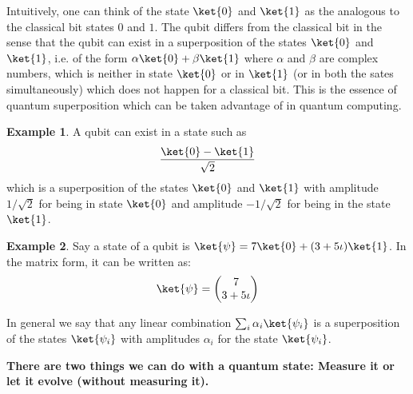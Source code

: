 \documentclass[12pt, oneside]{book}
\theoremstyle{definition}
\theoremstyle{definition}
\newtheorem{example}{Example}[section]
\theoremstyle{remark}
\begin{document}
Intuitively, one can think of the state $\ket{0}$ and $\ket{1}$ as the analogous to the classical bit states $0$ and $1$. 
The qubit differs from the classical bit in the sense that the qubit can exist in a superposition of the states $\ket{0}$ and $\ket{1}$,
i.e. of the form $\alpha\ket{0}+\beta\ket{1}$ where $\alpha$ and $\beta$ are complex numbers, which is neither in state $\ket{0}$ or in $\ket{1}$ (or in both the sates 
simultaneously)  which does not happen for a classical bit. This is the essence of quantum superposition which can be taken advantage of in quantum computing.

\begin{example}
    A qubit can exist in a state such as 
    \[\dfrac{\ket{0}-\ket{1}}{\sqrt{2}}\]
    which is a superposition of the states $\ket{0}$ and $\ket{1}$ with amplitude $1/\sqrt{2}$ for being in state $\ket{0}$ and 
    amplitude $-1/\sqrt{2}$ for being in the state $\ket{1}$.
\end{example}
\begin{example}
    Say a state of a qubit is $\ket{\psi}=7\ket{0}+(3+5\iota)\ket{1}$. In the matrix form, it can be written as:
    \[
        \ket{\psi}=\begin{pmatrix} 7 \\ 3+5\iota \end{pmatrix}
    \]
\end{example}

In general we say that any linear combination $\sum_i \alpha_i \ket{\psi_i}$ is a superposition of the states $\ket{\psi_i}$ with amplitudes 
$\alpha_i$ for the state $\ket{\psi_i}$.

\textbf{There are two things we can do with a quantum state: Measure it or let it evolve (without measuring it).}
\end{document}
